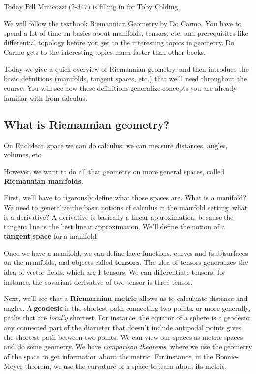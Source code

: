 
Today Bill Minicozzi (2-347) is filling in for Toby Colding.

We will follow the textbook \ul{Riemannian Geometry} by Do Carmo. You have to spend a lot of time on basics about manifolds, tensors, etc. and prerequisites like differential topology before you get to the interesting topics in geometry. Do Carmo gets to the interesting topics much faster than other books.

Today we give a quick overview of Riemannian geometry, and then introduce the basic definitions (manifolds, tangent spaces, etc.) that we'll need throughout the course. You will see how these definitions generalize concepts you are already familiar with from calculus. %

\subsection{What is Riemannian geometry?}

On Euclidean space we can do calculus; we can measure distances, angles, volumes, etc.

However, we want to do all that geometry on more general spaces, called \textbf{Riemannian manifolds}.

First, we'll have to rigorously define what those spaces are. What is a manifold? We need to generalize the basic notions of calculus in the manifold setting: what is a derivative? A derivative is basically a linear approximation, because the tangent line is the best linear approximation. We'll define the notion of a \textbf{tangent space} for a manifold.

Once we have a manifold, we can define have functions, curves and (sub)surfaces on the manifolds, and objects called \textbf{tensors}. %
The idea of tensors generalizes the idea of vector fields, which are 1-tensors. We can differentiate tensors; for instance, the covariant derivative of two-tensor is three-tensor.


Next, we'll see that a \textbf{Riemannian metric} allows us to calculuate distance and angles. A \textbf{geodesic} is the shortest path connecting two points, or more generally, paths that are {\it locally} shortest. For instance, the equator of a sphere is a geodesic: any connected part of the diameter that doesn't include antipodal points gives the shortest path between two points. We can view our spaces as metric spaces and do some geometry. We have \emph{comparison theorems}, where we use the geometry of the space to get information about the metric. For instance, in the Bonnie-Meyer theorem, we use the curvature of a space to learn about its metric. 

